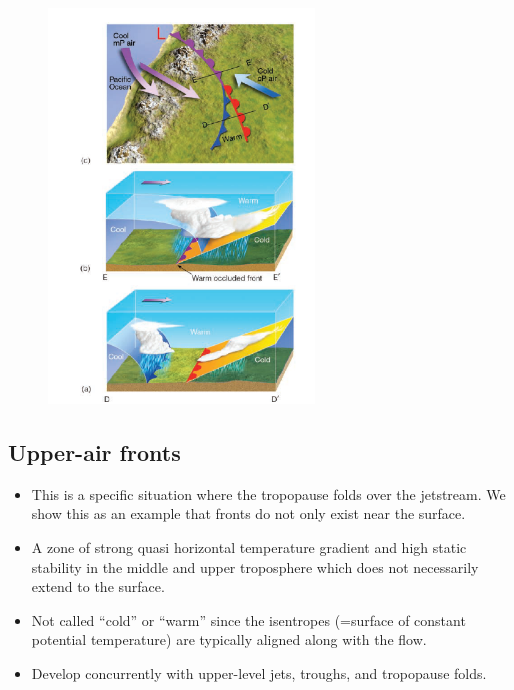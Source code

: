 \documentclass[12pt,oneside]{book}
\providecommand{\tightlist}{%
  \setlength{\itemsep}{0pt}\setlength{\parskip}{0pt}}
\begin{document}
\begin{figure}
{}

\caption{ }\label{fig:Fig624d}
\end{figure}\begin{figure}

{\centering \includegraphics[width=0.8\linewidth]{figures/Figure624e} 

}

\caption{ }\label{fig:Fig624e}
\end{figure}

\subsection{Upper-air fronts}\label{upper-air-fronts}

\begin{itemize}
\tightlist
\item
  This is a specific situation where the tropopause folds over the
  jetstream. We show this as an example that fronts do not only exist
  near the surface.
\item
  A zone of strong quasi horizontal temperature gradient and high static
  stability in the middle and upper troposphere which does not
  necessarily extend to the surface.
\item
  Not called ``cold'' or ``warm'' since the isentropes (=surface of
  constant potential temperature) are typically aligned along with the
  flow.
\item
  Develop concurrently with upper-level jets, troughs, and tropopause
  folds.
\end{itemize}
\end{document}
